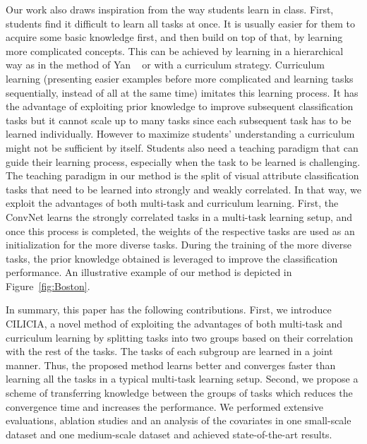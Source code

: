 \documentclass[10pt,twocolumn,letterpaper]{article}
\begin{document}
	Our work also draws inspiration from the way students learn in class. First, students find it difficult to learn all tasks at once. It is usually easier for them to acquire some basic knowledge first, and then build on top of that, by learning more complicated concepts. This can be achieved by learning in a hierarchical way as in the method of Yan \etal~\cite{yanhd} or with a curriculum strategy. Curriculum learning \cite{bengio2009curriculum, jiang2014self} (presenting easier examples before more complicated and learning tasks sequentially, instead of all at the same time) imitates this learning process. It has the advantage of exploiting prior knowledge to improve subsequent classification tasks but it cannot scale up to many tasks since each subsequent task has to be learned individually. However to maximize students' understanding a curriculum might not be sufficient by itself. Students also need a teaching paradigm that can guide their learning process, especially when the task to be learned is challenging. The teaching paradigm in our method is the split of visual attribute classification tasks that need to be learned into strongly and weakly correlated. In that way, we exploit the advantages of both multi-task and curriculum learning. First, the ConvNet learns the strongly correlated tasks in a multi-task learning setup, and once this process is completed, the weights of the respective tasks are used as an initialization for the more diverse tasks. During the training of the more diverse tasks, the prior knowledge obtained is leveraged to improve the classification performance. An illustrative example of our method is depicted in Figure~\ref{fig:Boston}. 
	
	In summary, this paper has the following contributions. First, we introduce CILICIA, a novel method of exploiting the advantages of both multi-task and curriculum learning by splitting tasks into two groups based on their correlation with the rest of the tasks. The tasks of each subgroup are learned in a joint manner. Thus, the proposed method learns better and converges faster than learning all the tasks in a typical multi-task learning setup. Second, we propose a scheme of transferring knowledge between the groups of tasks which reduces the convergence time and increases the performance. We performed extensive evaluations, ablation studies and an analysis of the covariates in one small-scale dataset and one medium-scale dataset and achieved state-of-the-art results. 
	
\end{document}
